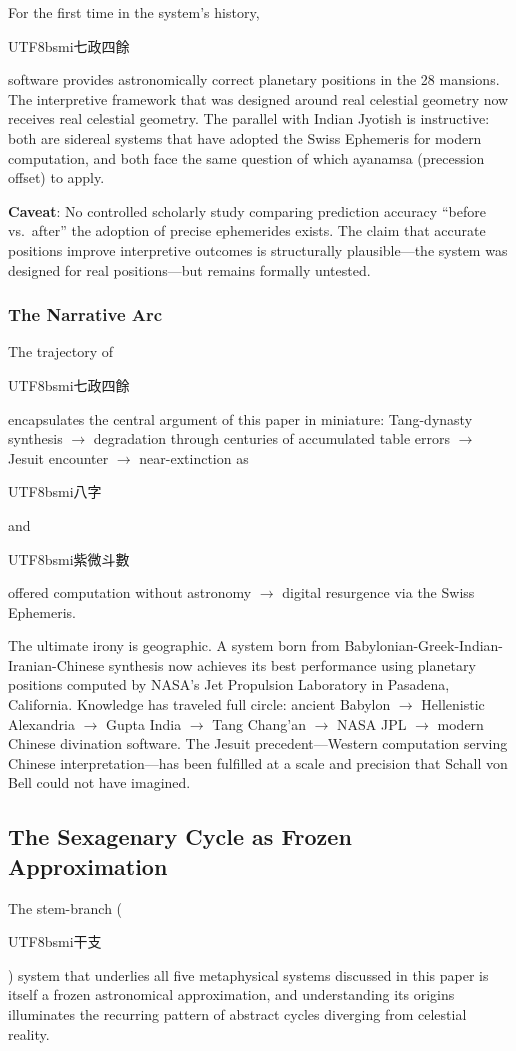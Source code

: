 \documentclass[10pt,a4paper]{article}
\newcommand{\zh}[1]{\begin{CJK}{UTF8}{bsmi}#1\end{CJK}}
\begin{document}
For the first time in the system's history, \zh{七政四餘} software
provides astronomically correct planetary positions in the 28 mansions.
The interpretive framework that was designed around real celestial geometry
now receives real celestial geometry. The parallel with Indian
Jyotish is instructive: both are sidereal systems that have adopted the
Swiss Ephemeris for modern computation, and both face the same question
of which ayanamsa (precession offset) to apply.

\textbf{Caveat}: No controlled scholarly study comparing prediction
accuracy ``before vs.\ after'' the adoption of precise ephemerides
exists.  The claim that accurate positions improve interpretive
outcomes is structurally plausible---the system was designed for real
positions---but remains formally untested.

\subsubsection{The Narrative Arc}

The trajectory of \zh{七政四餘} encapsulates the central argument of
this paper in miniature: Tang-dynasty synthesis $\to$ degradation through
centuries of accumulated table errors $\to$ Jesuit encounter $\to$
near-extinction as \zh{八字} and \zh{紫微斗數} offered computation
without astronomy $\to$ digital resurgence via the Swiss Ephemeris.

The ultimate irony is geographic. A system born from
Babylonian-Greek-Indian-Iranian-Chinese synthesis now achieves its best
performance using planetary positions computed by NASA's Jet Propulsion
Laboratory in Pasadena, California. Knowledge has traveled full circle:
ancient Babylon $\to$ Hellenistic Alexandria $\to$ Gupta India $\to$
Tang Chang'an $\to$ NASA JPL $\to$ modern Chinese divination software.
The Jesuit precedent---Western computation serving Chinese
interpretation---has been fulfilled at a scale and precision that Schall
von Bell could not have imagined.

\subsection{The Sexagenary Cycle as Frozen Approximation}
\label{subsec:sexagenary}

The stem-branch (\zh{干支}) system that underlies all five metaphysical
systems discussed in this paper is itself a frozen astronomical
approximation, and understanding its origins illuminates the recurring
pattern of abstract cycles diverging from celestial reality.
\end{document}

